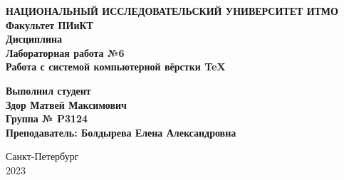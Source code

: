 \begin{titlepage}
    \begin{center}
        \textbf{\large{НАЦИОНАЛЬНЫЙ ИССЛЕДОВАТЕЛЬСКИЙ УНИВЕРСИТЕТ ИТМО}}\\
        \vspace{0,5cm}
        \textbf{Факультет {ПИиКТ}}\\ %
        \vspace{5cm}
        \textbf{Дисциплина {}}\\ %
        \textbf{Лабораторная работа №6}\\ %
        {\Large \textbf{Работа с системой компьютерной вёрстки \TeX}}\\[1em]
    \end{center}
    \vspace{6cm}
    \begin{flushright}
        \textbf{Выполнил студент \\{Здор Матвей Максимович}\\
        Группа № {P3124}}\\ %
        \textbf{Преподаватель: {Болдырева Елена Александровна}} %
    \end{flushright}
    \vfill
    \begin{center}
        Санкт-Петербург\\
        2023 %
    \end{center}
\end{titlepage}
